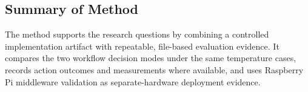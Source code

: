 	\subsection{Summary of Method}\label{subsec:method-summary}

The method supports the research questions by combining a controlled implementation artifact with repeatable, file-based evaluation evidence. It compares the two workflow decision modes under the same temperature cases, records action outcomes and measurements where available, and uses Raspberry Pi middleware validation as separate-hardware deployment evidence.
